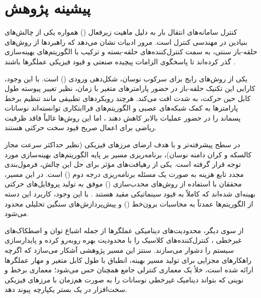 
\section{پیشینه پژوهش}

کنترل سامانه‌های انتقال بار به دلیل ماهیت زیرفعال () همواره یکی از چالش‌های بنیادین در مهندسی کنترل است. مرور ادبیات نشان می‌دهد که راهبردها از روش‌های حلقه-باز سنتی، به سمت کنترل‌کننده‌های حلقه-بسته و ترکیب با الگوریتم‌های بهینه‌سازی گذر کرده‌اند تا پاسخگوی الزامات پیچیده صنعتی و قیود فیزیکی عملگرها باشند \cite{Ramli2017Review}.

یکی از روش‌های رایج برای سرکوب نوسان، شکل‌دهی ورودی () است. با این وجود، کارایی این تکنیک حلقه-باز در حضور پارامترهای متغیر با زمان، نظیر تغییر پیوسته طول کابل حین حرکت، به شدت افت می‌کند. هرچند رویکردهای تطبیقی مانند تنظیم برخط پارامترها به کمک شبکه‌های عصبی و الگوریتم‌های فراابتکاری توانسته‌اند نوسانات پسماند را در حضور عملیات بالابر کاهش دهند \cite{Ramli2018Neural}، اما این روش‌ها غالباً فاقد ظرفیت ریاضی برای اعمال صریح قیود سخت حرکتی هستند.

در سطح پیشرفته‌تر و با هدف ارضای مرزهای فیزیکی (نظیر حداکثر سرعت مجاز کالسکه و کران دامنه نوسان)، برنامه‌ریزی مسیر بر پایه الگوریتم‌های بهینه‌سازی مورد توجه قرار گرفته است. یکی از رهیافت‌های مؤثر برای حل این چالش، فرمول‌بندی مجدد تابع هزینه به صورت یک مسئله برنامه‌ریزی درجه دوم () است. در این مسیر، محققان با استفاده از روش‌های محدب‌سازی () موفق به تولید پروفایل‌های حرکتی بهینه‌ای شده‌اند که کاملاً به قیود سینماتیکی مقید هستند \cite{Sun2018Energy}. با این وجود، کاربرد این دسته از الگوریتم‌ها عمدتاً به محاسبات برون‌خط () و پیش‌پردازش‌های سنگین تحلیلی محدود می‌شود.

از سوی دیگر، محدودیت‌های دینامیکی عملگرها از جمله اشباع توان و اصطکاک‌های غیرخطی \cite{Golovin2017PFC}، کنترل‌کننده‌های کلاسیک را با محدودیت بهره روبه‌رو کرده و پایدارسازی سیستم را دشوار می‌سازند. سنتز این مسیر پژوهشی آشکار می‌سازد که اگرچه راهکارهای مجزایی برای تولید مسیر بهینه، انطباق با طول کابل متغیر و مهار عملگرها ارائه شده است، خلأ یک معماری کنترلی جامع همچنان حس می‌شود؛ معماری برخط و نوینی که بتواند دینامیک غیرخطی نوسانات را به صورت هم‌زمان با مرزهای فیزیکی سخت‌افزار در یک بستر یکپارچه پیوند دهد.